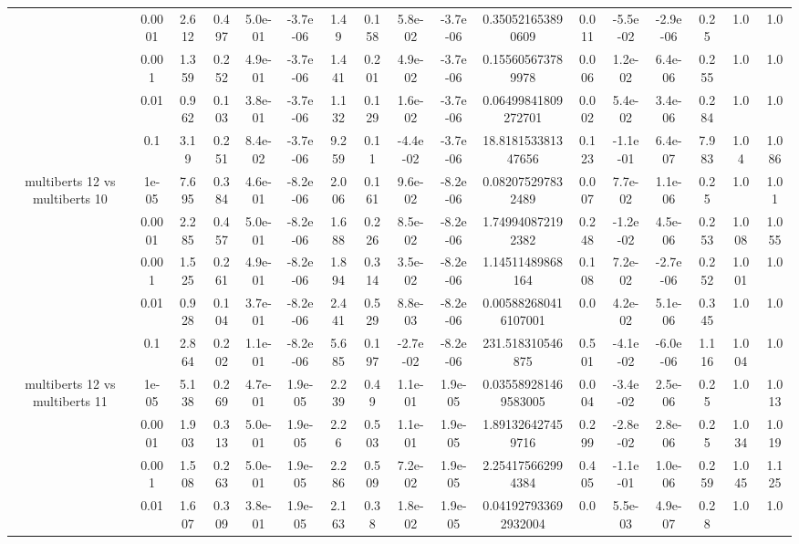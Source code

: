 \begin{tabular}{|c|c|c|c|c|c|c|c|c|c|c|c|c|c|c|c|c|}
 & 0.0001 & 2.612 & 0.497 & 5.0e-01 & -3.7e-06 & 1.49 & 0.158 & 5.8e-02 & -3.7e-06 & 0.350521653890609 & 0.011 & -5.5e-02 & -2.9e-06 & 0.25 & 1.0 & 1.0 \\
 & 0.001 & 1.359 & 0.252 & 4.9e-01 & -3.7e-06 & 1.441 & 0.201 & 4.9e-02 & -3.7e-06 & 0.155605673789978 & 0.006 & 1.2e-02 & 6.4e-06 & 0.255 & 1.0 & 1.0 \\
 & 0.01 & 0.962 & 0.103 & 3.8e-01 & -3.7e-06 & 1.132 & 0.129 & 1.6e-02 & -3.7e-06 & 0.06499841809272701 & 0.002 & 5.4e-02 & 3.4e-06 & 0.284 & 1.0 & 1.0 \\
 & 0.1 & 3.19 & 0.251 & 8.4e-02 & -3.7e-06 & 9.259 & 0.11 & -4.4e-02 & -3.7e-06 & 18.818153381347656 & 0.123 & -1.1e-01 & 6.4e-07 & 7.983 & 1.04 & 1.086 \\
\hline
\multirow{5}{*}{multiberts 12 vs multiberts 10} & 1e-05 & 7.695 & 0.384 & 4.6e-01 & -8.2e-06 & 2.006 & 0.161 & 9.6e-02 & -8.2e-06 & 0.082075297832489 & 0.007 & 7.7e-02 & 1.1e-06 & 0.25 & 1.0 & 1.01 \\
 & 0.0001 & 2.285 & 0.457 & 5.0e-01 & -8.2e-06 & 1.688 & 0.226 & 8.5e-02 & -8.2e-06 & 1.749940872192382 & 0.248 & -1.2e-02 & 4.5e-06 & 0.253 & 1.008 & 1.055 \\
 & 0.001 & 1.525 & 0.261 & 4.9e-01 & -8.2e-06 & 1.894 & 0.314 & 3.5e-02 & -8.2e-06 & 1.14511489868164 & 0.108 & 7.2e-02 & -2.7e-06 & 0.252 & 1.001 & 1.0 \\
 & 0.01 & 0.928 & 0.104 & 3.7e-01 & -8.2e-06 & 2.441 & 0.529 & 8.8e-03 & -8.2e-06 & 0.005882680416107001 & 0.0 & 4.2e-02 & 5.1e-06 & 0.345 & 1.0 & 1.0 \\
 & 0.1 & 2.864 & 0.202 & 1.1e-01 & -8.2e-06 & 5.685 & 0.197 & -2.7e-02 & -8.2e-06 & 231.518310546875 & 0.501 & -4.1e-02 & -6.0e-06 & 1.116 & 1.004 & 1.0 \\
\hline
\multirow{5}{*}{multiberts 12 vs multiberts 11} & 1e-05 & 5.138 & 0.269 & 4.7e-01 & 1.9e-05 & 2.239 & 0.49 & 1.1e-01 & 1.9e-05 & 0.035589281469583005 & 0.004 & -3.4e-02 & 2.5e-06 & 0.25 & 1.0 & 1.013 \\
 & 0.0001 & 1.903 & 0.313 & 5.0e-01 & 1.9e-05 & 2.26 & 0.503 & 1.1e-01 & 1.9e-05 & 1.891326427459716 & 0.299 & -2.8e-02 & 2.8e-06 & 0.25 & 1.034 & 1.019 \\
 & 0.001 & 1.508 & 0.263 & 5.0e-01 & 1.9e-05 & 2.286 & 0.509 & 7.2e-02 & 1.9e-05 & 2.254175662994384 & 0.405 & -1.1e-01 & 1.0e-06 & 0.259 & 1.045 & 1.125 \\
 & 0.01 & 1.607 & 0.309 & 3.8e-01 & 1.9e-05 & 2.163 & 0.38 & 1.8e-02 & 1.9e-05 & 0.041927933692932004 & 0.0 & 5.5e-03 & 4.9e-07 & 0.28 & 1.0 & 1.0 \\

\end{tabular}
